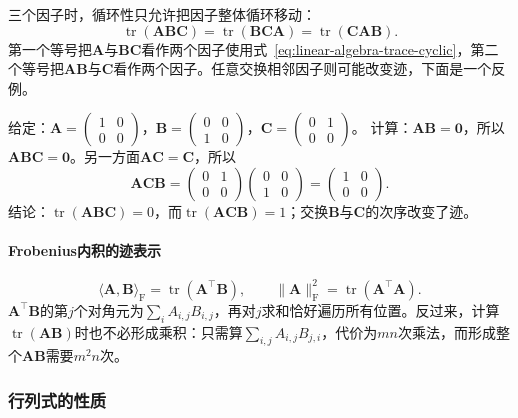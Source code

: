 三个因子时，循环性只允许把因子整体循环移动：
\[
 \operatorname{tr}(\bm A\bm B\bm C)=\operatorname{tr}(\bm B\bm C\bm A)=\operatorname{tr}(\bm C\bm A\bm B).
\]
第一个等号把$\bm A$与$\bm B\bm C$看作两个因子使用式~\eqref{eq:linear-algebra-trace-cyclic}，第二个等号把$\bm A\bm B$与$\bm C$看作两个因子。任意交换相邻因子则可能改变迹，下面是一个反例。
\begin{example}[反例：交换相邻因子会改变迹]
\label{ex:ls-trace-adjacent-swap}
给定：$\bm A=\left(\begin{smallmatrix}1&0\\0&0\end{smallmatrix}\right)$，$\bm B=\left(\begin{smallmatrix}0&0\\1&0\end{smallmatrix}\right)$，$\bm C=\left(\begin{smallmatrix}0&1\\0&0\end{smallmatrix}\right)$。
计算：$\bm A\bm B=\bm0$，所以$\bm A\bm B\bm C=\bm0$。另一方面$\bm A\bm C=\bm C$，所以
\[
 \bm A\bm C\bm B=\begin{pmatrix}0&1\\0&0\end{pmatrix}\begin{pmatrix}0&0\\1&0\end{pmatrix}=\begin{pmatrix}1&0\\0&0\end{pmatrix}.
\]
结论：$\operatorname{tr}(\bm A\bm B\bm C)=0$，而$\operatorname{tr}(\bm A\bm C\bm B)=1$；交换$\bm B$与$\bm C$的次序改变了迹。
\end{example}

\paragraph{Frobenius内积的迹表示}
\[
 \langle\bm A,\bm B\rangle_{\mathrm F}=\operatorname{tr}(\bm A^\top\bm B),\qquad
 \lVert\bm A\rVert_{\mathrm F}^2=\operatorname{tr}(\bm A^\top\bm A).
\]
$\bm A^\top\bm B$的第$j$个对角元为$\sum_i A_{i,j}B_{i,j}$，再对$j$求和恰好遍历所有位置。反过来，计算$\operatorname{tr}(\bm A\bm B)$时也不必形成乘积：只需算$\sum_{i,j}A_{i,j}B_{j,i}$，代价为$mn$次乘法，而形成整个$\bm A\bm B$需要$m^2n$次。

\subsubsection{行列式的性质}
\label{sec:ls-determinant-properties}
\label{sec:prelim-determinants}

